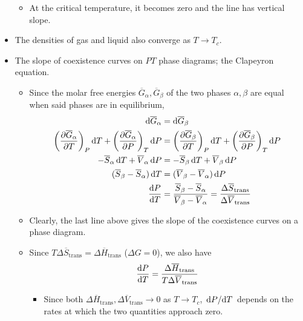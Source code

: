 \documentclass[../notes.tex]{subfiles}
\begin{document}
\begin{itemize}
    \begin{itemize}
        \item At the critical temperature, it becomes zero and the line has vertical slope.
    \end{itemize}
    \item The densities of gas and liquid also converge as $T\to T_c$.
    \item The slope of coexistence curves on $PT$ phase diagrams; the Clapeyron equation.
    \begin{itemize}
        \item Since the molar free energies $\overline{G}_\alpha,\overline{G}_\beta$ of the two phases $\alpha,\beta$ are equal when said phases are in equilibrium,
        \begin{align*}
            \dd{\overline{G}_\alpha} &= \dd{\overline{G}_\beta}\\
            \left( \pdv{\overline{G}_\alpha}{T} \right)_P\dd{T}+\left( \pdv{\overline{G}_\alpha}{P} \right)_T\dd{P} &= \left( \pdv{\overline{G}_\beta}{T} \right)_P\dd{T}+\left( \pdv{\overline{G}_\beta}{P} \right)_T\dd{P}\\
            -\overline{S}_\alpha\dd{T}+\overline{V}_\alpha\dd{P} &= -\overline{S}_\beta\dd{T}+\overline{V}_\beta\dd{P}\\
            (\overline{S}_\beta-\overline{S}_\alpha)\dd{T} &= (\overline{V}_\beta-\overline{V}_\alpha)\dd{P}\\
            \dv{P}{T} &= \frac{\overline{S}_\beta-\overline{S}_\alpha}{\overline{V}_\beta-\overline{V}_\alpha} = \frac{\Delta\overline{S}_\text{trans}}{\Delta\overline{V}_\text{trans}}
        \end{align*}
        \item Clearly, the last line above gives the slope of the coexistence curves on a phase diagram.
        \item Since $T\Delta\overline{S}_\text{trans}=\Delta\overline{H}_\text{trans}$ ($\Delta G=0$), we also have
        \begin{equation*}
            \dv{P}{T} = \frac{\Delta\overline{H}_\text{trans}}{T\Delta\overline{V}_\text{trans}}
        \end{equation*}
        \begin{itemize}
            \item Since both $\Delta\overline{H}_\text{trans},\Delta\overline{V}_\text{trans}\to 0$ as $T\to T_c$, $\dv*{P}{T}$ depends on the rates at which the two quantities approach zero.
        \end{itemize}

\end{itemize}
\end{itemize}
\end{document}
